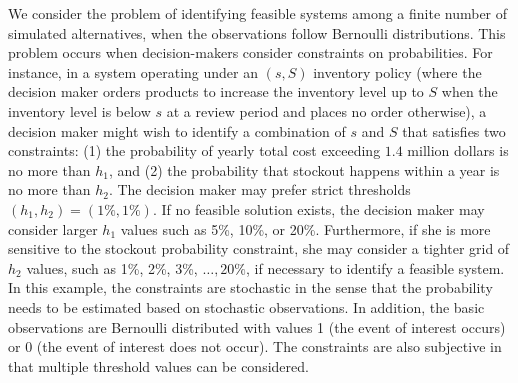 \documentclass[11pt]{article}
\begin{document}
We consider the problem of identifying feasible systems among a finite number of simulated alternatives, when the observations follow Bernoulli distributions. This problem occurs when decision-makers consider constraints on probabilities. 
For instance, in a system operating under an $(s,S)$ inventory policy (where the decision maker orders products to increase the inventory level up to $S$ when the inventory level is below $s$ at a review period and places no order otherwise), a decision maker might wish to identify a combination of $s$ and $S$ that satisfies two constraints: (1) the probability of yearly total cost exceeding $1.4$ million dollars is no more than $h_1$, and (2) the probability that stockout happens within a year is no more than $h_2$. The decision maker may prefer strict thresholds $(h_1, h_2)=(1\%, 1\%)$. If no feasible solution exists, the decision maker may consider larger $h_1$ values such as 5\%, 10\%, or 20\%. Furthermore, if she is more sensitive to the stockout probability constraint, she may consider a tighter grid of $h_2$ values, such as 1\%, 2\%, 3\%, $\ldots, 20\%$, if necessary to identify a feasible system.         
In this example, the constraints are stochastic in the sense that the probability needs to be estimated based on stochastic observations. In addition, the basic observations are Bernoulli distributed with values 1 (the event of interest occurs) or 0 (the event of interest does not occur). The constraints are also subjective in that multiple threshold values can be considered. 
\end{document}
